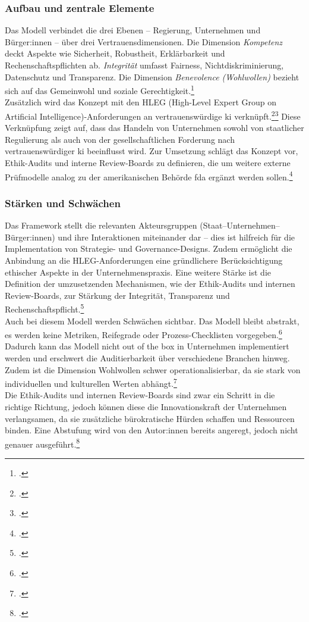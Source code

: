 \subsubsection{Aufbau und zentrale Elemente}
\label{subsubsec:multilevel_aufbau}
Das Modell verbindet die drei Ebenen -- Regierung, Unternehmen und Bürger:innen -- über drei Vertrauensdimensionen.
Die Dimension \textit{Kompetenz} deckt Aspekte wie Sicherheit, Robustheit, Erklärbarkeit und Rechenschaftspflichten ab.
\textit{Integrität} umfasst Fairness, Nichtdiskriminierung, Datenschutz und Transparenz.
Die Dimension \textit{Benevolence (Wohlwollen)} bezieht sich auf das Gemeinwohl und soziale Gerechtigkeit.\footcite[10]{choungMultilevelFrameworkAI2023}
\\
Zusätzlich wird das Konzept mit den HLEG (High-Level Expert Group on Artificial Intelligence)-Anforderungen an vertrauenswürdige \ac{ki} verknüpft.\footcite[8]{choungMultilevelFrameworkAI2023}\footcite{europeancomissionEthicsGuidelinesTrustworthy}
Diese Verknüpfung zeigt auf, dass das Handeln von Unternehmen sowohl von staatlicher Regulierung als auch von der gesellschaftlichen Forderung nach vertrauenswürdiger \ac{ki} beeinflusst wird.
Zur Umsetzung schlägt das Konzept vor, Ethik-Audits und interne Review-Boards zu definieren, die um weitere externe Prüfmodelle analog zu der amerikanischen Behörde \ac{fda} ergänzt werden sollen.\footcite[10]{choungMultilevelFrameworkAI2023}

\subsubsection{Stärken und Schwächen}
\label{subsubsec:multilevel_stärken_schwächen}
Das Framework stellt die relevanten Akteursgruppen (Staat–Unternehmen–Bürger:innen) und ihre Interaktionen miteinander dar – dies ist hilfreich für die Implementation von Strategie- und Governance-Designs.
Zudem ermöglicht die Anbindung an die HLEG-Anforderungen eine gründlichere Berücksichtigung ethischer Aspekte in der Unternehmenspraxis.
Eine weitere Stärke ist die Definition der umzusetzenden Mechanismen, wie der Ethik-Audits und internen Review-Boards, zur Stärkung der Integrität, Transparenz und Rechenschaftspflicht.\footcite[11]{choungMultilevelFrameworkAI2023}
\\
Auch bei diesem Modell werden Schwächen sichtbar.
Das Modell bleibt abstrakt, es werden keine Metriken, Reifegrade oder Prozess-Checklisten vorgegeben.\footcite[9-10]{choungMultilevelFrameworkAI2023}
Dadurch kann das Modell nicht \glqq{}out of the box\grqq{} in Unternehmen implementiert werden und erschwert die Auditierbarkeit über verschiedene Branchen hinweg.
Zudem ist die Dimension \glqq{}Wohlwollen\grqq{} schwer operationalisierbar, da sie stark von individuellen und kulturellen Werten abhängt.\footcite[9-10]{choungMultilevelFrameworkAI2023}
\\
Die Ethik-Audits und internen Review-Boards sind zwar ein Schritt in die richtige Richtung, jedoch können diese die Innovationskraft der Unternehmen verlangsamen, da sie zusätzliche bürokratische Hürden schaffen und Ressourcen binden.
Eine Abstufung wird von den Autor:innen bereits angeregt, jedoch nicht genauer ausgeführt.\footcite[11]{choungMultilevelFrameworkAI2023}

